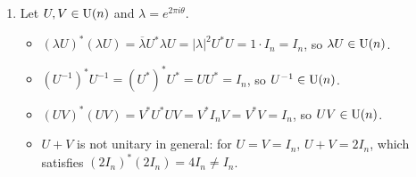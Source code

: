 \begin{exercisesolution}
\begin{enumerate}[label=\textbf{(\alph*)}]
    \item Let $U, V \in \operatorname{U}(n)$ and $\lambda = e^{2\pi i \theta}$.
    \begin{itemize}
        \item $(\lambda U)^* (\lambda U) = \overline{\lambda} U^* \lambda U = |\lambda|^2 U^* U = 1 \cdot I_n = I_n$, so $\lambda U \in \operatorname{U}(n)$.
        \item $(U^{-1})^* U^{-1} = (U^*)^* U^* = U U^* = I_n$, so $U^{-1} \in \operatorname{U}(n)$.
        \item $(UV)^* (UV) = V^* U^* U V = V^* I_n V = V^* V = I_n$, so $UV \in \operatorname{U}(n)$.
        \item $U + V$ is not unitary in general: for $U = V = I_n$, $U + V = 2I_n$, which satisfies $(2I_n)^*(2I_n) = 4I_n \ne I_n$. \qedhere
    \end{itemize}
\end{enumerate}
\end{exercisesolution}

